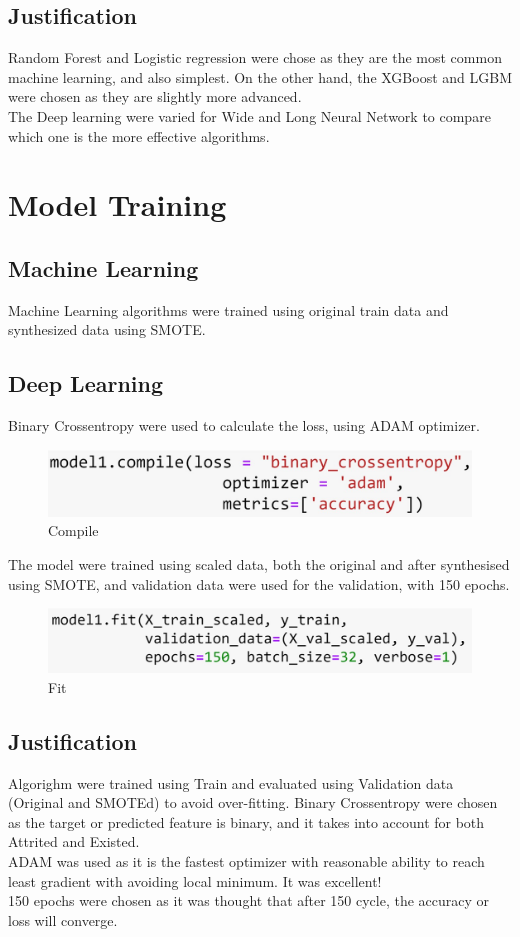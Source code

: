 \documentclass{homeworg}
\begin{document}
\subsection{Justification}
Random Forest and Logistic regression were chose as they are the most common machine learning, and also simplest. On the other hand, the XGBoost and LGBM were chosen as they are slightly more advanced.\\
The Deep learning were varied for Wide and Long Neural Network to compare which one is the more effective algorithms.

\section{Model Training}
\subsection{Machine Learning}
Machine Learning algorithms were trained using original train data and synthesized data using SMOTE.
\subsection{Deep Learning}
Binary Crossentropy were used to calculate the loss, using ADAM optimizer.
\begin{figure}[H]
    \centering
    \includegraphics[scale=0.5]{figure/compile.jpg}
    \caption{Compile}
    \label{fig:compile}
\end{figure}
The model were trained using scaled data, both the original and after synthesised using SMOTE, and validation data were used for the validation, with 150 epochs.
\begin{figure}[H]
    \centering
    \includegraphics[scale=0.5]{figure/fit.jpg}
    \caption{Fit}
    \label{fig:fit}
\end{figure}

\subsection{Justification}
Algorighm were trained using Train and evaluated using Validation data (Original and SMOTEd) to avoid over-fitting.
Binary Crossentropy were chosen as the target or predicted feature is binary, and it takes into account for both Attrited and Existed.\\
ADAM was used as it is the fastest optimizer with reasonable ability to reach least gradient with avoiding local minimum. It was excellent!\\
150 epochs were chosen as it was thought that after 150 cycle, the accuracy or loss will converge.
\end{document}
